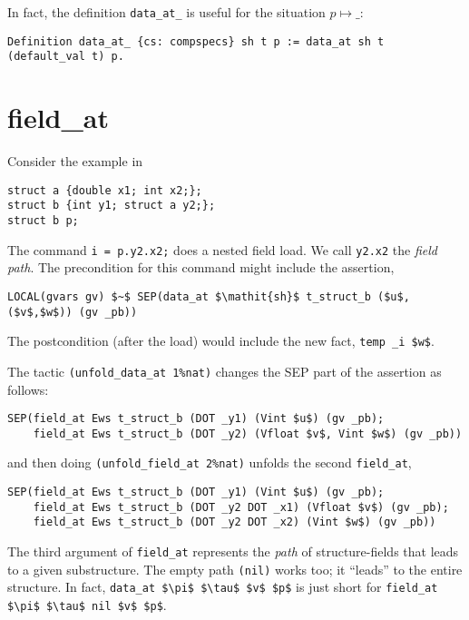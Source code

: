 \documentclass[12pt,fleqn,openany,oneside,showtrims]{memoir}
\begin{document}
In fact, the definition \lstinline{data_at_} is useful
for the situation $p \mapsto \_$:

\begin{lstlisting}
Definition data_at_ {cs: compspecs} sh t p := data_at sh t (default_val t) p.
\end{lstlisting}

\chapter{\upshape field\_at}
\label{refcard:field-at}
\label{refcard:nested-load} %

Consider the example in 
\begin{lstlisting}
struct a {double x1; int x2;};
struct b {int y1; struct a y2;};
struct b p;
\end{lstlisting}
The command  \lstinline{i = p.y2.x2;} does a nested field load.
We call \lstinline{y2.x2} the \emph{field path}.
The precondition for this command might include the assertion,
\begin{lstlisting}
LOCAL(gvars gv) $~$ SEP(data_at $\mathit{sh}$ t_struct_b ($u$,($v$,$w$)) (gv _pb))
\end{lstlisting}
The postcondition (after the load) would include the new \LOCAL{} fact,
\lstinline{temp _i $w$}.

The tactic \lstinline{(unfold_data_at 1%nat)}
\label{refcard:unfold-data-at}
changes the SEP part of the assertion as follows:
\begin{lstlisting}
SEP(field_at Ews t_struct_b (DOT _y1) (Vint $u$) (gv _pb);
    field_at Ews t_struct_b (DOT _y2) (Vfloat $v$, Vint $w$) (gv _pb))
\end{lstlisting}
and then doing \lstinline{(unfold_field_at 2%nat)}
unfolds the second \lstinline{field_at},
\begin{lstlisting}
SEP(field_at Ews t_struct_b (DOT _y1) (Vint $u$) (gv _pb);
    field_at Ews t_struct_b (DOT _y2 DOT _x1) (Vfloat $v$) (gv _pb);
    field_at Ews t_struct_b (DOT _y2 DOT _x2) (Vint $w$) (gv _pb))
\end{lstlisting}
The third argument of \lstinline{field_at} represents
the \emph{path} of structure-fields that leads to a given
substructure.  The empty path \lstinline{(nil)}
works too; it ``leads'' to the entire structure.
In fact,
\lstinline{data_at $\pi$ $\tau$ $v$ $p$} is just short for
\lstinline{field_at $\pi$ $\tau$ nil $v$ $p$}.
\end{document}
